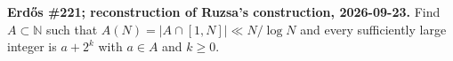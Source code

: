 \textbf{Erd\H{o}s \#221; reconstruction of Ruzsa's construction, 2026-09-23.}
Find $A\subset\mathbb N$ such that $A(N)=|A\cap[1,N]|\ll N/\log N$ and every sufficiently large integer is $a+2^k$ with $a\in A$ and $k\geq0$.
